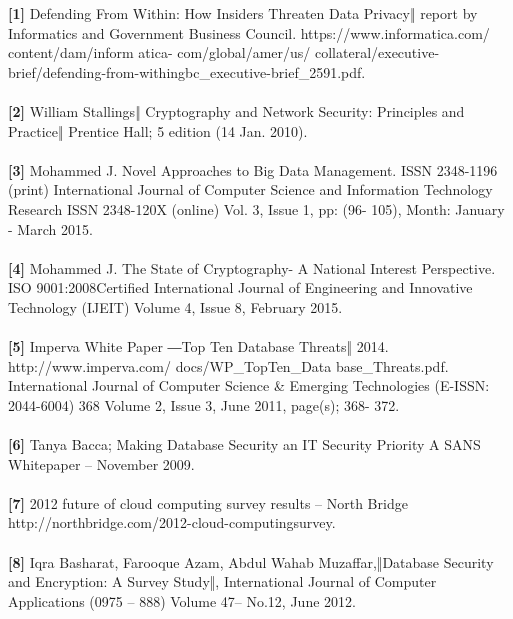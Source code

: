 
%
%

\begin{thebibliography}
\textbf{[1]} Defending From Within: How Insiders Threaten Data Privacy‖ report by Informatics and Government Business Council. https://www.informatica.com/ content/dam/inform atica- com/global/amer/us/ collateral/executive- brief/defending-from-withingbc\_executive-brief\_2591.pdf.\\\\


\textbf{[2]} William Stallings‖ Cryptography and Network
Security: Principles and Practice‖ Prentice Hall; 5
edition (14 Jan. 2010).\\\\


\textbf{[3]} Mohammed J. Novel Approaches to Big Data
Management. ISSN 2348-1196 (print) International
Journal of Computer Science and Information
Technology Research ISSN 2348-120X (online)
Vol. 3, Issue 1, pp: (96- 105), Month: January - March
2015.\\\\

\textbf{[4]} Mohammed J. The State of Cryptography- A National
Interest Perspective. ISO 9001:2008Certified
International Journal of Engineering and Innovative
Technology (IJEIT) Volume 4, Issue 8, February
2015.\\\\

\textbf{[5]} Imperva White Paper ―Top Ten Database Threats‖
2014. http://www.imperva.com/
docs/WP\_TopTen\_Data base\_Threats.pdf.
International Journal of Computer Science & Emerging
Technologies (E-ISSN: 2044-6004) 368 Volume 2,
Issue 3, June 2011, page(s); 368- 372.\\\\


\textbf{[6]} Tanya Bacca; Making Database Security an IT Security
Priority A SANS Whitepaper – November 2009.\\\\


\textbf{[7]} 2012 future of cloud computing survey results – North
Bridge http://northbridge.com/2012-cloud-computingsurvey.\\\\

\textbf{[8]} Iqra Basharat, Farooque Azam, Abdul Wahab
Muzaffar,‖Database Security and Encryption: A Survey
Study‖, International Journal of Computer
Applications (0975 – 888) Volume 47– No.12,
June 2012.\\\\



\end{thebibliography}
